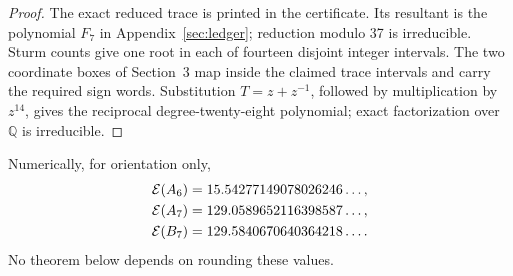 \begin{proof}
The exact reduced trace is printed in the certificate.  Its resultant is the
polynomial \(F_7\) in Appendix~\ref{sec:ledger}; reduction modulo 37 is
irreducible.  Sturm counts give one root in each of fourteen disjoint integer
intervals.  The two coordinate boxes of Section~3 map inside the claimed
trace intervals and carry the required sign words.  Substitution
\(T=z+z^{-1}\), followed by multiplication by \(z^{14}\), gives the
reciprocal degree-twenty-eight polynomial; exact factorization over
\(\mathbb Q\) is irreducible.
\end{proof}

Numerically, for orientation only,
\begin{align*}
 \mathcal E(A_6)&=15.54277149078026246\ldots,\\
 \mathcal E(A_7)&=129.0589652116398587\ldots,\\
 \mathcal E(B_7)&=129.5840670640364218\ldots.
\end{align*}
No theorem below depends on rounding these values.
